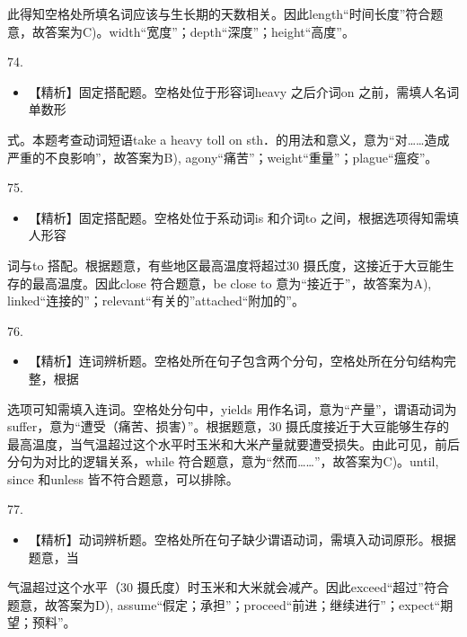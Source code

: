 \documentclass[UTF8,11pt]{ctexart}
\begin{document}
此得知空格处所填名词应该与生长期的天数相关。因此length“时间长度”符合题意，故答案为C)。width“宽度”；depth“深度”；height“高度”。


74.


\begin{itemize}[leftmargin=2em,itemsep=.2em,topsep=.4em]\item[B.] 【精析】固定搭配题。空格处位于形容词heavy 之后介词on 之前，需填人名词单数形
\end{itemize}

式。本题考查动词短语take a heavy toll on sth．的用法和意义，意为“对……造成严重的不良影响”，故答案为B), agony“痛苦”；weight“重量”；plague“瘟疫”。


75.


\begin{itemize}[leftmargin=2em,itemsep=.2em,topsep=.4em]\item[A.] 【精析】固定搭配题。空格处位于系动词is 和介词to 之间，根据选项得知需填人形容
\end{itemize}

词与to 搭配。根据题意，有些地区最高温度将超过30 摄氏度，这接近于大豆能生存的最高温度。因此close 符合题意，be close to 意为“接近于”，故答案为A), linked“连接的”；relevant“有关的”attached“附加的”。


76.


\begin{itemize}[leftmargin=2em,itemsep=.2em,topsep=.4em]\item[C.] 【精析】连词辨析题。空格处所在句子包含两个分句，空格处所在分句结构完整，根据
\end{itemize}

选项可知需填入连词。空格处分句中，yields 用作名词，意为“产量”，谓语动词为suffer，意为“遭受（痛苦、损害）”。根据题意，30 摄氏度接近于大豆能够生存的最高温度，当气温超过这个水平时玉米和大米产量就要遭受损失。由此可见，前后分句为对比的逻辑关系，while 符合题意，意为“然而……”，故答案为C)。until, since 和unless 皆不符合题意，可以排除。


77.


\begin{itemize}[leftmargin=2em,itemsep=.2em,topsep=.4em]\item[D.] 【精析】动词辨析题。空格处所在句子缺少谓语动词，需填入动词原形。根据题意，当
\end{itemize}

气温超过这个水平（30 摄氏度）时玉米和大米就会减产。因此exceed“超过”符合题意，故答案为D), assume“假定；承担”；proceed“前进；继续进行”；expect“期望；预料”。
\end{document}
